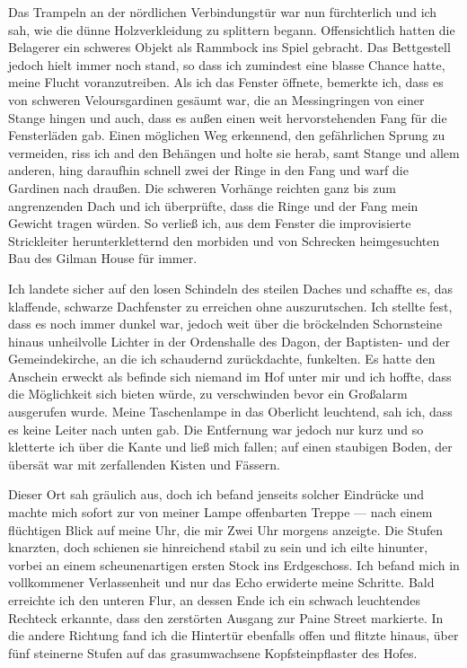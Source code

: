 Das Trampeln an der nördlichen Verbindungstür war nun fürchterlich und ich sah, wie die dünne Holzverkleidung zu splittern begann. Offensichtlich hatten die Belagerer ein schweres Objekt als Rammbock ins Spiel gebracht. Das Bettgestell jedoch hielt immer noch stand, so dass ich zumindest eine blasse Chance hatte, meine Flucht voranzutreiben. Als ich das Fenster öffnete, bemerkte ich, dass es von schweren Veloursgardinen gesäumt war, die an Messingringen von einer Stange hingen und auch, dass es außen einen weit hervorstehenden Fang für die Fensterläden gab. Einen möglichen Weg erkennend, den gefährlichen Sprung zu vermeiden, riss ich and den Behängen und holte sie herab, samt Stange und allem anderen, hing daraufhin schnell zwei der Ringe in den Fang und warf die Gardinen nach draußen. Die schweren Vorhänge reichten ganz bis zum angrenzenden Dach und ich überprüfte, dass die Ringe und der Fang mein Gewicht tragen würden. So verließ ich, aus dem Fenster die improvisierte Strickleiter herunterkletternd den morbiden und von Schrecken heimgesuchten Bau des Gilman House für immer.

Ich landete sicher auf den losen Schindeln des steilen Daches und schaffte es, das klaffende, schwarze Dachfenster zu erreichen ohne auszurutschen. Ich stellte fest, dass es noch immer dunkel war, jedoch weit über die bröckelnden Schornsteine hinaus unheilvolle Lichter in der Ordenshalle des Dagon, der Baptisten- und der Gemeindekirche, an die ich schaudernd zurückdachte, funkelten. Es hatte den Anschein erweckt als befinde sich niemand im Hof unter mir und ich hoffte, dass die Möglichkeit sich bieten würde, zu verschwinden bevor ein Großalarm ausgerufen wurde. Meine Taschenlampe in das Oberlicht leuchtend, sah ich, dass es keine Leiter nach unten gab. Die Entfernung war jedoch nur kurz und so kletterte ich über die Kante und ließ mich fallen; auf einen staubigen Boden, der übersät war mit zerfallenden Kisten und Fässern.

Dieser Ort sah gräulich aus, doch ich befand jenseits solcher Eindrücke und machte mich sofort zur von meiner Lampe offenbarten Treppe --- nach einem flüchtigen Blick auf meine Uhr, die mir Zwei Uhr morgens anzeigte. Die Stufen knarzten, doch schienen sie hinreichend stabil zu sein und ich eilte hinunter, vorbei an einem scheunenartigen ersten Stock ins Erdgeschoss. Ich befand mich in vollkommener Verlassenheit und nur das Echo erwiderte meine Schritte. Bald erreichte ich den unteren Flur, an dessen Ende ich ein schwach leuchtendes Rechteck erkannte, dass den zerstörten Ausgang zur Paine Street markierte. In die andere Richtung fand ich die Hintertür ebenfalls offen und flitzte hinaus, über fünf steinerne Stufen auf das grasumwachsene Kopfsteinpflaster des Hofes.

